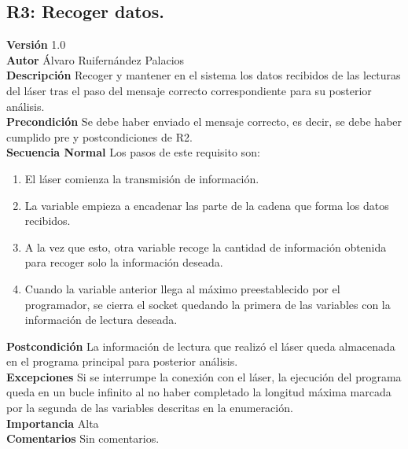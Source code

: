 \subsection{R3: Recoger datos.}
\textbf{Versión} 1.0\\
\textbf{Autor} Álvaro Ruifernández Palacios\\
\textbf{Descripción} Recoger y mantener en el sistema los datos recibidos de las lecturas del láser tras el paso del mensaje correcto correspondiente para su posterior análisis.\\
\textbf{Precondición} Se debe haber enviado el mensaje correcto, es decir, se debe haber cumplido pre y postcondiciones de R2.\\
\textbf{Secuencia Normal} Los pasos de este requisito son:
\begin{enumerate}
	\item El láser comienza la transmisión de información.
	\item La variable empieza a encadenar las parte de la cadena que forma los datos recibidos.
	\item  A la vez que esto, otra variable recoge la cantidad de información obtenida para recoger solo la información deseada.
	\item Cuando la variable anterior llega al máximo preestablecido por el programador, se cierra el socket quedando la primera de las variables con la información de lectura deseada.
\end{enumerate}
\textbf{Postcondición} La información de lectura que realizó el láser queda almacenada en el programa principal para posterior análisis.\\
\textbf{Excepciones} Si se interrumpe la conexión con el láser, la ejecución del programa queda en un bucle infinito al no haber completado la longitud máxima marcada por la segunda de las variables descritas en la enumeración.\\
\textbf{Importancia} Alta\\
\textbf{Comentarios} Sin comentarios.\\

